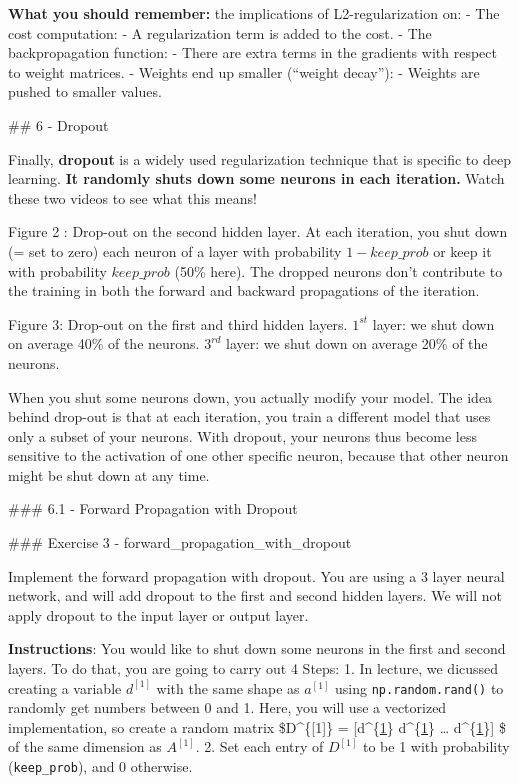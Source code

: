 \documentclass[11pt]{article}
\begin{document}
\textbf{What you should remember:} the implications of L2-regularization
on: - The cost computation: - A regularization term is added to the
cost. - The backpropagation function: - There are extra terms in the
gradients with respect to weight matrices. - Weights end up smaller
(``weight decay''): - Weights are pushed to smaller values.

    \#\# 6 - Dropout

Finally, \textbf{dropout} is a widely used regularization technique that
is specific to deep learning. \textbf{It randomly shuts down some
neurons in each iteration.} Watch these two videos to see what this
means!

Figure 2 : Drop-out on the second hidden layer. At each iteration, you
shut down (= set to zero) each neuron of a layer with probability
\(1 - keep\_prob\) or keep it with probability \(keep\_prob\) (50\%
here). The dropped neurons don't contribute to the training in both the
forward and backward propagations of the iteration.

Figure 3: Drop-out on the first and third hidden layers. \(1^{st}\)
layer: we shut down on average 40\% of the neurons. \(3^{rd}\) layer: we
shut down on average 20\% of the neurons.

When you shut some neurons down, you actually modify your model. The
idea behind drop-out is that at each iteration, you train a different
model that uses only a subset of your neurons. With dropout, your
neurons thus become less sensitive to the activation of one other
specific neuron, because that other neuron might be shut down at any
time.

\#\#\# 6.1 - Forward Propagation with Dropout

\#\#\# Exercise 3 - forward\_propagation\_with\_dropout

Implement the forward propagation with dropout. You are using a 3 layer
neural network, and will add dropout to the first and second hidden
layers. We will not apply dropout to the input layer or output layer.

\textbf{Instructions}: You would like to shut down some neurons in the
first and second layers. To do that, you are going to carry out 4 Steps:
1. In lecture, we dicussed creating a variable \(d^{[1]}\) with the same
shape as \(a^{[1]}\) using \texttt{np.random.rand()} to randomly get
numbers between 0 and 1. Here, you will use a vectorized implementation,
so create a random matrix \$D\^{}\{{[}1{]}\} = {[}d\^{}\{\url{1}\}
d\^{}\{\href{2}{1}\} \ldots{} d\^{}\{\href{m}{1}\}{]} \$ of the same
dimension as \(A^{[1]}\). 2. Set each entry of \(D^{[1]}\) to be 1 with
probability (\texttt{keep\_prob}), and 0 otherwise.
\end{document}
